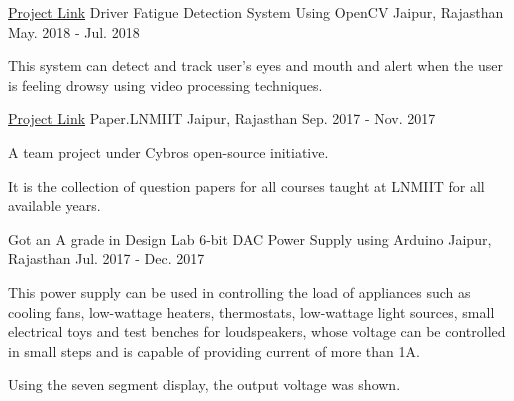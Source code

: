 

\begin{cventries}

  \cventry
    {\href{https://github.com/nimbus1212/driver_fatigue_detection}{Project Link}}
    {Driver Fatigue Detection System Using OpenCV} %
    {Jaipur, Rajasthan} %
    {May. 2018 - Jul. 2018} %
    {
      \begin{cvitems} %
        \item {This system can detect and track user's eyes and mouth and alert when the user is feeling drowsy using video processing techniques.}
      \end{cvitems}
    }
    
  \cventry
    {\href{https://github.com/nimbus1212/paper.lnmiit}{Project Link}}
    {Paper.LNMIIT} %
    {Jaipur, Rajasthan} %
    {Sep. 2017 - Nov. 2017} %
    {
      \begin{cvitems} %
        \item {A team project under Cybros open-source initiative.}
        \item {It is the collection of question papers for all courses taught at LNMIIT for all available years.}
      \end{cvitems}
    }
    
   \cventry
    {Got an A grade in Design Lab}
    {6-bit DAC Power Supply using Arduino} %
    {Jaipur, Rajasthan} %
    {Jul. 2017 - Dec. 2017} %
    {
      \begin{cvitems} %
        \item {This power supply can be used in controlling the load of appliances such as cooling fans, low-wattage heaters, thermostats, low-wattage light sources, small electrical toys and test benches for loudspeakers, whose voltage can be controlled in small steps and is capable of providing current of more than 1A.}
        \item {Using the seven segment display, the output voltage was shown.   }
      \end{cvitems}
    }

\end{cventries}
